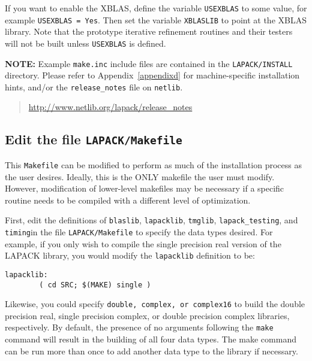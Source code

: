 \documentclass[11pt]{report}
\begin{document}
If you want to enable the XBLAS, define the variable \texttt{USEXBLAS}
to some value, for example \texttt{USEXBLAS = Yes}.  Then set the
variable \texttt{XBLASLIB} to point at the XBLAS library.  Note that
the prototype iterative refinement routines and their testers will not
be built unless \texttt{USEXBLAS} is defined.

\textbf{NOTE:}  Example \texttt{make.inc} include files are contained in the
\texttt{LAPACK/INSTALL} directory.  Please refer to
Appendix~\ref{appendixd} for machine-specific installation hints, and/or
the \texttt{release\_notes} file on \texttt{netlib}.
\begin{quote}
\url{http://www.netlib.org/lapack/release\_notes}
\end{quote}

\subsection{Edit the file \texttt{LAPACK/Makefile}}\label{toplevelmakefile}

This \texttt{Makefile} can be modified to perform as much of the
installation process as the user desires.  Ideally, this is the ONLY
makefile the user must modify.  However, modification of lower-level
makefiles may be necessary if a specific routine needs to be compiled
with a different level of optimization.  

First, edit the definitions of \texttt{blaslib}, \texttt{lapacklib},
\texttt{tmglib}, \texttt{lapack\_testing}, and \texttt{timing}\footnotemark[\value{footnote}] in the file \texttt{LAPACK/Makefile}
to specify the data types desired.  For example,
if you only wish to compile the single precision real version of the
LAPACK library, you would modify the \texttt{lapacklib} definition to be:

\begin{verbatim}
lapacklib:
        ( cd SRC; $(MAKE) single )
\end{verbatim}

Likewise, you could specify \texttt{double, complex, or complex16} to
build the double precision real, single precision complex, or double
precision complex libraries, respectively.  By default, the presence of
no arguments following the \texttt{make} command will result in the
building of all four data types.
The make command can be run more than once to add another
data type to the library if necessary.

      
\end{document}
